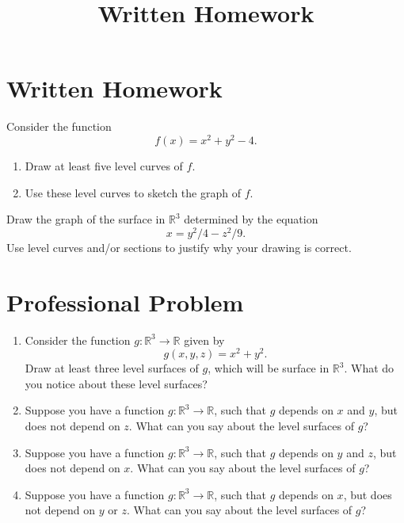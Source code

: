 \documentclass{ximera}
\title{Written Homework}
\begin{document}
\begin{abstract}
\end{abstract}
\maketitle

\section{Written Homework}

\begin{problem}
Consider the function 
\[
f(x) = x^2 + y^2 - 4.
\]
\begin{enumerate}
\item Draw at least five level curves of $f$.
\item Use these level curves to sketch the graph of $f$.
\end{enumerate}
\end{problem}

\begin{problem}
Draw the graph of the surface in $\mathbb{R}^3$ determined by the equation
\[
x = y^2/4 - z^2/9.
\]
Use level curves and/or sections to justify why your drawing is correct.
\end{problem}

\section{Professional Problem}

\begin{problem}

\begin{enumerate}
\item Consider the function $g:\mathbb{R}^3\rightarrow\mathbb{R}$ given by
\[
g(x,y,z) = x^2+y^2.
\]
Draw at least three level surfaces of $g$, which will be surface in $\mathbb{R}^3$. What do you notice about these level surfaces?
\item Suppose you have a function $g:\mathbb{R}^3\rightarrow\mathbb{R}$, such that $g$ depends on $x$ and $y$, but does not depend on $z$. What can you say about the level surfaces of $g$? 
\item Suppose you have a function $g:\mathbb{R}^3\rightarrow\mathbb{R}$, such that $g$ depends on $y$ and $z$, but does not depend on $x$. What can you say about the level surfaces of $g$? 
\item Suppose you have a function $g:\mathbb{R}^3\rightarrow\mathbb{R}$, such that $g$ depends on $x$, but does not depend on $y$ or $z$. What can you say about the level surfaces of $g$? 
\end{enumerate}
\end{problem}
\end{document}
